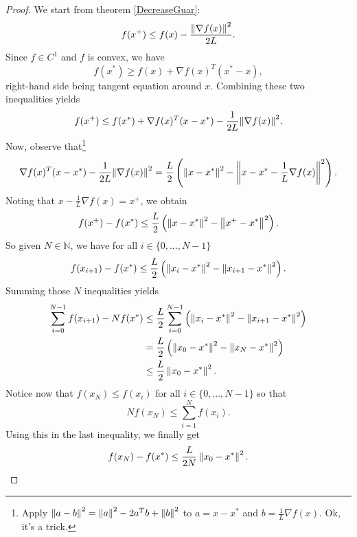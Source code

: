 \begin{proof}
We start from theorem \ref{DecreaseGuar}:
\begin{equation*}
f(x^+) \le f(x) - \frac{{\left\Vert \nabla f(x) \right\Vert}^2}{2L} .
\end{equation*}
Since $f \in C^1$ and $f$ is convex, we have
\begin{equation*}
f(x^*) \ge f(x) + \nabla f(x)^T(x^*-x),
\end{equation*}
right-hand side being tangent equation around $x$. Combining these two inequalities yields
\begin{equation*}
f(x^+) \le f(x^*) + \nabla f(x)^T(x-x^*) - \frac{1}{2L} {\left\Vert \nabla f(x) \right\Vert}^2 .
\end{equation*}
Now, observe that\footnote{Apply $\left\Vert a-b \right\Vert^2 = \left\Vert a \right\Vert^2 - 2a^Tb + \left\Vert b \right\Vert^2$ to $a = x-x^*$ and $b = \frac{1}{L}\nabla f(x)$. Ok, it's a trick.}
\begin{equation*}
\nabla f(x)^T(x-x^*) - \frac{1}{2L}{\left\Vert \nabla f(x) \right\Vert}^2 = \frac{L}{2} \left( \left\Vert x-x^* \right\Vert^2 - \left\Vert x-x^*-\frac{1}{L}\nabla f(x) \right\Vert^2 \right) .
\end{equation*}
Noting that $x-\frac{1}{L}\nabla f(x) = x^+$, we obtain
\begin{equation*}
f(x^+) - f(x^*) \le \frac{L}{2} \left( \left\Vert x-x^* \right\Vert^2 - \left\Vert x^+-x^* \right\Vert^2 \right) .
\end{equation*}
So given $N \in \mathbb{N}$, we have for all $i \in \{0,...,N-1\}$
\begin{equation*}
f(x_{i+1}) - f(x^*) \le \frac{L}{2} \left( \left\Vert x_i-x^* \right\Vert^2 - \left\Vert x_{i+1}-x^* \right\Vert^2 \right) .
\end{equation*}
Summing those $N$ inequalities yields
\begin{align*}
\sum_{i=0}^{N-1}f(x_{i+1}) - N f(x^*) &\le \frac{L}{2} \sum_{i=0}^{N-1}\left( \left\Vert x_i-x^* \right\Vert^2 - \left\Vert x_{i+1}-x^* \right\Vert^2 \right) \\
&= \frac{L}{2} \left( \left\Vert x_0-x^* \right\Vert^2 - \left\Vert x_N-x^* \right\Vert^2 \right) \\
&\le \frac{L}{2} \left\Vert x_0-x^* \right\Vert^2 .
\end{align*}
Notice now that $f(x_N) \le f(x_i)$ for all $i \in \{0,...,N-1\}$ so that
\begin{equation*}
 N f(x_N) \le \sum_{i=1}^Nf(x_i) .
\end{equation*}
Using this in the last inequality, we finally get
\begin{equation*}
f(x_{N}) - f(x^*) \le  \frac{L}{2N} \left\Vert x_0-x^* \right\Vert^2 . \qedhere
\end{equation*}
\end{proof}

